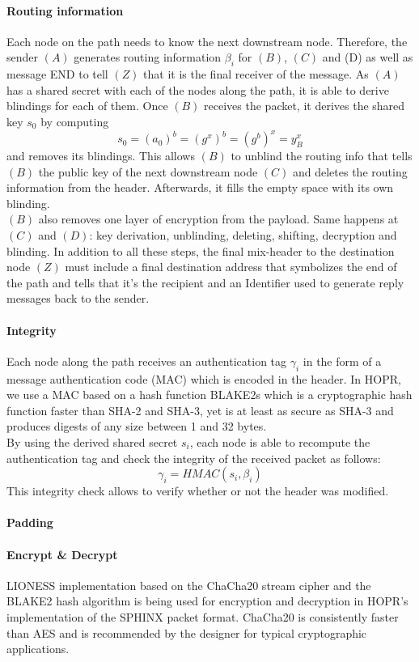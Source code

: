 \paragraph{Routing information}
Each node on the path needs to know the next downstream node. Therefore, the sender $(A)$ generates routing information $\beta_i$ for $(B)$, $(C)$ and (D) as well as message END to tell $(Z)$ that it is the final receiver of the message. 
\newline As $(A)$ has a shared secret with each of the nodes along the path, it is able to derive blindings for each of them.
\newline Once $(B)$ receives the packet, it derives the shared key $s_0$ by computing $$s_0=(a_0)^b=(g^x)^b=(g^b)^x=y^x_B$$ and removes its blindings. This allows $(B)$ to unblind the routing info that tells $(B)$ the public key of the next downstream node $(C)$ and deletes the routing information from the header. Afterwards, it fills the empty space with its own blinding.
\\$(B)$ also removes one layer of encryption from the payload.
Same happens at $(C)$ and $(D)$: key derivation, unblinding, deleting, shifting, decryption and blinding. 
In addition to all these steps, the final mix-header to the destination node $(Z)$ must include a final destination address that symbolizes the end of the path and tells that it’s the recipient and an Identifier used to generate reply messages back to the sender.

\paragraph{Integrity}
Each node along the path receives an authentication tag $\gamma_i$ in the form of a message authentication code (MAC)
which is encoded in the header. In HOPR, we use a MAC based on a hash function BLAKE2s which is a cryptographic hash function faster than SHA-2 and SHA-3, yet is at least as secure as SHA-3 and produces digests of any size between 1 and 32 bytes. 
\\By using the derived shared secret $s_i$, each node is able to recompute the authentication tag and check the integrity of the received packet as follows: $$\gamma_i=HMAC(s_i,\beta_i)$$
This integrity check allows to verify whether or not the header was modified.
\paragraph{Padding}
\paragraph{Encrypt \& Decrypt}
LIONESS implementation based on the ChaCha20 stream cipher and the BLAKE2 hash algorithm is being used for encryption and decryption in HOPR's implementation of the SPHINX packet format. ChaCha20 is consistently faster than AES and is recommended by the designer for typical cryptographic applications.










